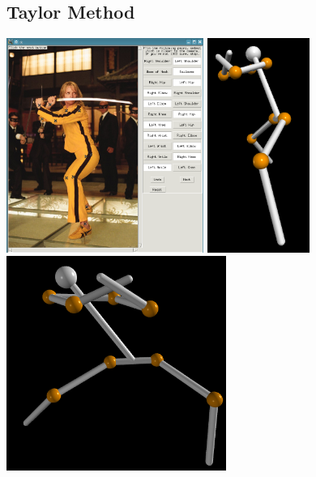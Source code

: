 \documentclass[final]{article}
\begin{document}
\begin{spacing}{1.1}
\subsection{Taylor Method}
\begin{center}
  \includegraphics[height=7cm]{fig/killbill.png}
  \includegraphics[height=7cm]{fig/killbillrecons.png}
  \includegraphics[height=7cm]{fig/killbillrecons2.png}
\end{center}


\end{spacing}
\end{document}
